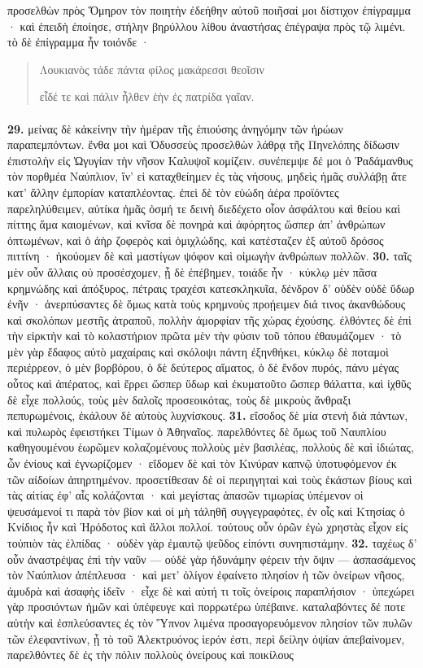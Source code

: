 \documentclass[a4paper, 11pt, oneside, polutonikogreek, german]{article}
\begin{document}
προσελθὼν πρὸς Ὅμηρον τὸν ποιητὴν ἐδεήθην αὐτοῦ ποιῆσαί μοι δίστιχον ἐπίγραμμα · καὶ ἐπειδὴ ἐποίησε, στήλην βηρύλλου λίθου ἀναστήσας ἐπέγραψα πρὸς τῷ λιμένι. τὸ δὲ ἐπίγραμμα ἦν τοιόνδε ·
\begin{quote}
\footnotesize
Λουκιανὸς τάδε πάντα φίλος μακάρεσσι θεοῖσιν

εἶδέ τε καὶ πάλιν ἦλθεν ἑὴν ἐς πατρίδα γαῖαν.
\end{quote}
\paragraph{}
\textbf{29.} μείνας δὲ κἀκείνην τὴν ἡμέραν τῆς ἐπιούσης ἀνηγόμην τῶν ἡρώων παραπεμπόντων. ἔνθα μοι καὶ Ὀδυσσεὺς προσελθὼν λάθρᾳ τῆς Πηνελόπης δίδωσιν ἐπιστολὴν εἰς Ὠγυγίαν τὴν νῆσον Καλυψοῖ κομίζειν. συνέπεμψε δέ μοι ὁ Ῥαδάμανθυς τὸν πορθμέα Ναύπλιον, ἵν' εἰ καταχθείημεν ἐς τὰς νήσους, μηδεὶς ἡμᾶς συλλάβῃ ἅτε κατ' ἄλλην ἐμπορίαν καταπλέοντας. ἐπεὶ δὲ τὸν εὐώδη ἀέρα προϊόντες παρεληλύθειμεν, αὐτίκα ἡμᾶς ὀσμή τε δεινὴ διεδέχετο οἷον ἀσφάλτου καὶ θείου καὶ πίττης ἅμα καιομένων, καὶ κνῖσα δὲ πονηρὰ καὶ ἀφόρητος ὥσπερ ἀπ' ἀνθρώπων ὀπτωμένων, καὶ ὁ ἀὴρ ζοφερὸς καὶ ὁμιχλώδης, καὶ κατέσταζεν ἐξ αὐτοῦ δρόσος πιττίνη · ἠκούομεν δὲ καὶ μαστίγων ψόφον καὶ οἰμωγὴν ἀνθρώπων πολλῶν. \textbf{30.} ταῖς μὲν οὖν ἄλλαις οὐ προσέσχομεν, ᾗ δὲ ἐπέβημεν, τοιάδε ἦν · κύκλῳ μὲν πᾶσα κρημνώδης καὶ ἀπόξυρος, πέτραις τραχέσι κατεσκληκυῖα, δένδρον δ' οὐδὲν οὐδὲ ὕδωρ ἐνῆν · ἀνερπύσαντες δὲ ὅμως κατὰ τοὺς κρημνοὺς προῄειμεν διά τινος ἀκανθώδους καὶ σκολόπων μεστῆς ἀτραποῦ, πολλὴν ἀμορφίαν τῆς χώρας ἐχούσης. ἐλθόντες δὲ ἐπὶ τὴν εἱρκτὴν καὶ τὸ κολαστήριον πρῶτα μὲν τὴν φύσιν τοῦ τόπου ἐθαυμάζομεν · τὸ μὲν γὰρ ἔδαφος αὐτὸ μαχαίραις καὶ σκόλοψι πάντη ἐξηνθήκει, κύκλῳ δὲ ποταμοὶ περιέρρεον, ὁ μὲν βορβόρου, ὁ δὲ δεύτερος αἵματος, ὁ δὲ ἔνδον πυρός, πάνυ μέγας οὗτος καὶ ἀπέρατος, καὶ ἔρρει ὥσπερ ὕδωρ καὶ ἐκυματοῦτο ὥσπερ θάλαττα, καὶ ἰχθῦς δὲ εἶχε πολλούς, τοὺς μὲν δαλοῖς προσεοικότας, τοὺς δὲ μικροὺς ἄνθραξι πεπυρωμένοις, ἐκάλουν δὲ αὐτοὺς λυχνίσκους. \textbf{31.} εἴσοδος δὲ μία στενὴ διὰ πάντων, καὶ πυλωρὸς ἐφειστήκει Τίμων ὁ Ἀθηναῖος. παρελθόντες δὲ ὅμως τοῦ Ναυπλίου καθηγουμένου ἑωρῶμεν κολαζομένους πολλοὺς μὲν βασιλέας, πολλοὺς δὲ καὶ ἰδιώτας, ὧν ἐνίους καὶ ἐγνωρίζομεν · εἴδομεν δὲ καὶ τὸν Κινύραν καπνῷ ὑποτυφόμενον ἐκ τῶν αἰδοίων ἀπηρτημένον. προσετίθεσαν δὲ οἱ περιηγηταὶ καὶ τοὺς ἑκάστων βίους καὶ τὰς αἰτίας ἐφ' αἷς κολάζονται · καὶ μεγίστας ἁπασῶν τιμωρίας ὑπέμενον οἱ ψευσάμενοί τι παρὰ τὸν βίον καὶ οἱ μὴ τἀληθῆ συγγεγραφότες, ἐν οἷς καὶ Κτησίας ὁ Κνίδιος ἦν καὶ Ἡρόδοτος καὶ ἄλλοι πολλοί. τούτους οὖν ὁρῶν ἐγὼ χρηστὰς εἶχον εἰς τοὐπιὸν τὰς ἐλπίδας · οὐδὲν γὰρ ἐμαυτῷ ψεῦδος εἰπόντι συνηπιστάμην. \textbf{32.} ταχέως δ' οὖν ἀναστρέψας ἐπὶ τὴν ναῦν --- οὐδὲ γὰρ ἠδυνάμην φέρειν τὴν ὄψιν --- ἀσπασάμενος τὸν Ναύπλιον ἀπέπλευσα · καὶ μετ' ὀλίγον ἐφαίνετο πλησίον ἡ τῶν ὀνείρων νῆσος, ἀμυδρὰ καὶ ἀσαφὴς ἰδεῖν · εἶχε δὲ καὶ αὐτή τι τοῖς ὀνείροις παραπλήσιον · ὑπεχώρει γὰρ προσιόντων ἡμῶν καὶ ὑπέφευγε καὶ πορρωτέρω ὑπέβαινε. καταλαβόντες δέ ποτε αὐτὴν καὶ ἐσπλεύσαντες ἐς τὸν Ὕπνον λιμένα προσαγορευόμενον πλησίον τῶν πυλῶν τῶν ἐλεφαντίνων, ᾗ τὸ τοῦ Ἀλεκτρυόνος ἱερόν ἐστι, περὶ δείλην ὀψίαν ἀπεβαίνομεν, παρελθόντες δὲ ἐς τὴν πόλιν πολλοὺς ὀνείρους καὶ ποικίλους 
\end{document}
